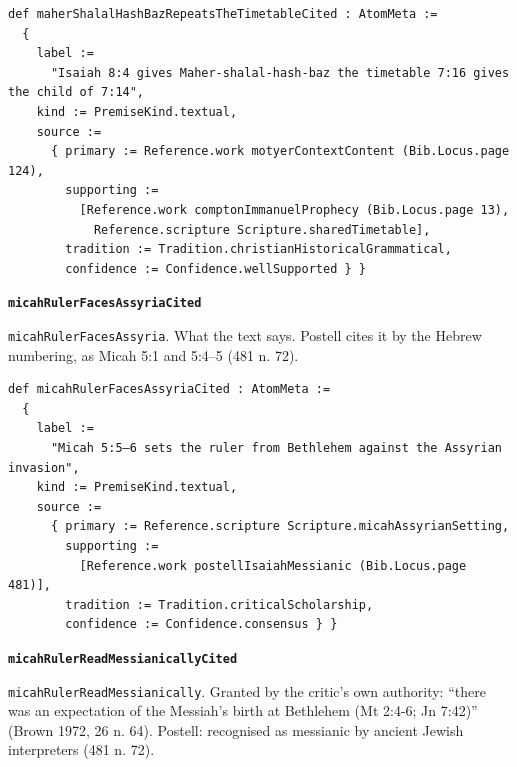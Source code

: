\documentclass[11pt]{article}
\begin{document}
{\small\begin{verbatim}
def maherShalalHashBazRepeatsTheTimetableCited : AtomMeta :=
  {
    label :=
      "Isaiah 8:4 gives Maher-shalal-hash-baz the timetable 7:16 gives the child of 7:14",
    kind := PremiseKind.textual,
    source :=
      { primary := Reference.work motyerContextContent (Bib.Locus.page 124),
        supporting :=
          [Reference.work comptonImmanuelProphecy (Bib.Locus.page 13),
            Reference.scripture Scripture.sharedTimetable],
        tradition := Tradition.christianHistoricalGrammatical,
        confidence := Confidence.wellSupported } }
\end{verbatim}}
\par\medskip\noindent\textbf{\texttt{micah\allowbreak{}Ruler\allowbreak{}Faces\allowbreak{}Assyria\allowbreak{}Cited}}\par\nobreak\noindent
\texttt{micah\allowbreak{}Ruler\allowbreak{}Faces\allowbreak{}Assyria}. What the text says. Postell cites it by the Hebrew numbering, as Micah 5:1 and 5:4–5 (481 n. 72).

{\small\begin{verbatim}
def micahRulerFacesAssyriaCited : AtomMeta :=
  {
    label :=
      "Micah 5:5–6 sets the ruler from Bethlehem against the Assyrian invasion",
    kind := PremiseKind.textual,
    source :=
      { primary := Reference.scripture Scripture.micahAssyrianSetting,
        supporting :=
          [Reference.work postellIsaiahMessianic (Bib.Locus.page 481)],
        tradition := Tradition.criticalScholarship,
        confidence := Confidence.consensus } }
\end{verbatim}}
\par\medskip\noindent\textbf{\texttt{micah\allowbreak{}Ruler\allowbreak{}Read\allowbreak{}Messianically\allowbreak{}Cited}}\par\nobreak\noindent
\texttt{micah\allowbreak{}Ruler\allowbreak{}Read\allowbreak{}Messianically}. Granted by the critic’s own authority: “there was an expectation of the Messiah’s birth at Bethlehem (Mt 2:4-6; Jn 7:42)” (Brown 1972, 26 n. 64). Postell: recognised as messianic by ancient Jewish interpreters (481 n. 72).
\end{document}
